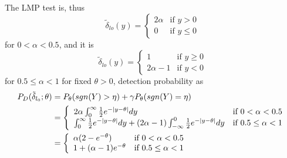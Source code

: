 \documentclass[a4paper,english,12pt]{article}
\begin{document}
The LMP test is, thus
\begin{equation*}
\tilde{\delta}_{lo}(y) =
\left\{
	\begin{array}{ll}
		2\alpha  & \mbox{if } y>0\\
		0 & \mbox{if } y\leq 0
	\end{array}
\right.
\end{equation*}
for $0<\alpha < 0.5$, and it is
\begin{equation*}
\tilde{\delta}_{lo}(y) =
\left\{
	\begin{array}{ll}
		1  & \mbox{if } y\geq0\\
		2\alpha - 1 & \mbox{if } y< 0
	\end{array}
\right.
\end{equation*}
for $0.5\leq \alpha < 1$
for fixed $\theta>0$, detection probability as
\begin{align*}
\mathnormal{P}_D(\tilde{\delta}_{l_{0}};\theta) &=\mathnormal{P}_{\theta}(sgn(Y)>\eta)+\gamma \mathnormal{P}_{\theta}(sgn(Y)=\eta)\\
									&=\left\{
											\begin{array}{ll}
												2\alpha \int_0^{\infty}\frac{1}{2}e^{-| y-\theta|}dy  & \mbox{if } 0<\alpha<0.5\\
												\int_0^{\infty}\frac{1}{2}e^{-| y-\theta|}dy+(2\alpha-1)\int_{-\infty}^{0}\frac{1}{2}e^{-| y-\theta|}dy & \mbox{if } 0.5\leq \alpha < 1
											\end{array}
										\right.\\
									&=\left\{
											\begin{array}{ll}
												\alpha(2-e^{-\theta})  & \mbox{if } 0<\alpha<0.5\\
												1+(\alpha-1)e^{-\theta} & \mbox{if } 0.5\leq \alpha < 1
											\end{array}
										\right.
\end{align*}
\end{document}
